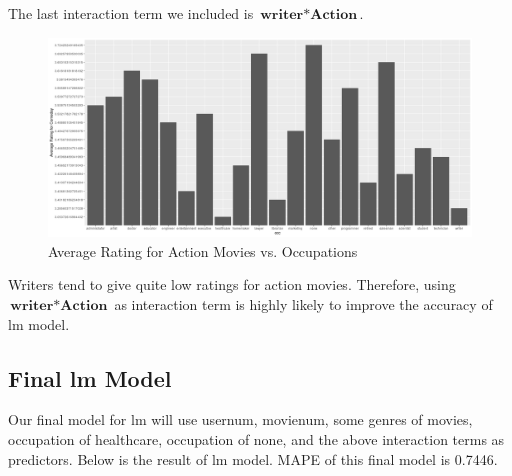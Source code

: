 \documentclass[11pt]{article}
\begin{document}
The last interaction term we included is $\textbf{writer} * \textbf{Action}$.
\begin{figure}[ht!]
\begin{center}
\includegraphics[width=\textwidth]{action.png}
\caption{Average Rating for Action Movies vs. Occupations}
\end{center}
\end{figure}
Writers tend to give quite low ratings for action movies. 
Therefore, using $\textbf{writer} * \textbf{Action}$ as interaction
term is highly likely to improve the accuracy of lm model.


\subsection{Final lm Model}
Our final model for lm will use usernum, movienum, some genres of 
movies, occupation of healthcare, occupation of none, and the above 
interaction terms as predictors. Below is the result of lm model. 
MAPE of this final model is 0.7446.
\end{document}
